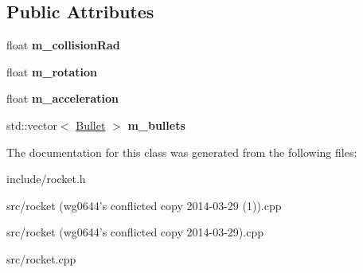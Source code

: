 \subsection*{Public Attributes}
\begin{DoxyCompactItemize}
\item 
\hypertarget{classRocket_a7b3d8c03507bf8622229738c9a90da4b}{
float {\bfseries m\_\-collisionRad}}
\label{classRocket_a7b3d8c03507bf8622229738c9a90da4b}

\item 
\hypertarget{classRocket_a5c74f7ed9572f09ea2a496b5566f76c2}{
float {\bfseries m\_\-rotation}}
\label{classRocket_a5c74f7ed9572f09ea2a496b5566f76c2}

\item 
\hypertarget{classRocket_a748730c15e3e80a21ef077e0d909b50c}{
float {\bfseries m\_\-acceleration}}
\label{classRocket_a748730c15e3e80a21ef077e0d909b50c}

\item 
\hypertarget{classRocket_aab26055040812dcd36fe3625aa926170}{
std::vector$<$ \hyperlink{classBullet}{Bullet} $>$ {\bfseries m\_\-bullets}}
\label{classRocket_aab26055040812dcd36fe3625aa926170}

\end{DoxyCompactItemize}


The documentation for this class was generated from the following files:\begin{DoxyCompactItemize}
\item 
include/rocket.h\item 
src/rocket (wg0644's conflicted copy 2014-\/03-\/29 (1)).cpp\item 
src/rocket (wg0644's conflicted copy 2014-\/03-\/29).cpp\item 
src/rocket.cpp\end{DoxyCompactItemize}
